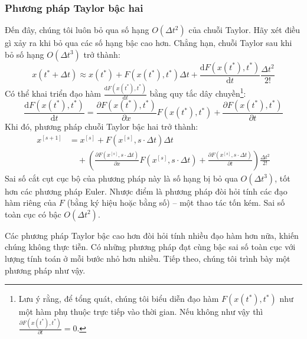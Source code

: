 \subsubsection{Phương pháp Taylor bậc hai}
Đến đây, chúng tôi luôn bỏ qua số hạng $O(\Delta t^2)$ của chuỗi Taylor. Hãy xét điều gì xảy ra khi bỏ qua các số hạng bậc cao hơn. Chẳng hạn, chuỗi Taylor sau khi bỏ số hạng $O(\Delta t^3)$ trở thành:
\[x(t^*+\Delta t)\approx x(t^*)+F(x(t^*),t^*)\Delta t+\frac{\mathrm{d}F(x(t^*),t^*)}{\mathrm{d}t}\frac{\Delta t^2}{2!}\]
Có thể khai triển đạo hàm $\frac{\mathrm{d}F(x(t^*),t^*)}{\mathrm{d}t}$ bằng quy tắc dây chuyền\footnote{Lưu ý rằng, để tổng quát, chúng tôi biểu diễn đạo hàm $F(x(t^*),t^*)$ như một hàm phụ thuộc trực tiếp vào thời gian. Nếu không như vậy thì $\frac{\partial F(x(t^*),t^*)}{\partial t}=0$.}:
\[\frac{\mathrm{d}F(x(t^*),t^*)}{\mathrm{d}t}=\frac{\partial F(x(t^*),t^*)}{\partial x}F(x(t^*),t^*)+\frac{\partial F(x(t^*),t^*)}{\partial t}\]
Khi đó, phương pháp chuỗi Taylor bậc hai trở thành:
\begin{equation}\begin{aligned}
x^{[s+1]}&=x^{[s]}+F(x^{[s]},s\cdot\Delta t)\Delta t\\
&\quad+\left(\frac{\partial F(x^{[s]},s\cdot\Delta t)}{\partial x}F(x^{[s]},s\cdot\Delta t)+\frac{\partial F(x^{[s]},s\cdot\Delta t)}{\partial t}\right)\frac{\Delta t^2}{2!}
\end{aligned}\tag{4.24}\end{equation}
Sai số cắt cụt cục bộ của phương pháp này là số hạng bị bỏ qua $O(\Delta t^3)$, tốt hơn các phương pháp Euler. Nhược điểm là phương pháp đòi hỏi tính các đạo hàm riêng của $F$ (bằng ký hiệu hoặc bằng số) -- một thao tác tốn kém. Sai số toàn cục có bậc $O(\Delta t^2)$.

Các phương pháp Taylor bậc cao hơn đòi hỏi tính nhiều đạo hàm hơn nữa, khiến chúng không thực tiễn. Có những phương pháp đạt cùng bậc sai số toàn cục với lượng tính toán ở mỗi bước nhỏ hơn nhiều. Tiếp theo, chúng tôi trình bày một phương pháp như vậy.

